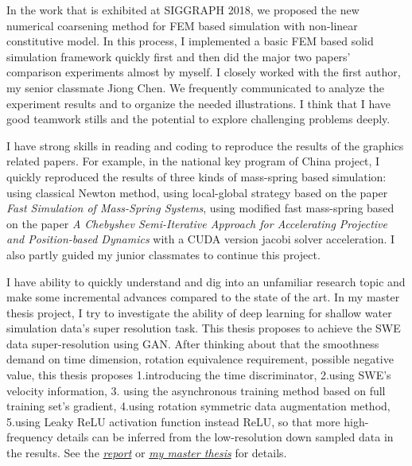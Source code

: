 \documentclass[a4paper,12pt]{article}
\begin{document}
In the work that is exhibited at SIGGRAPH 2018, we proposed the new numerical coarsening method for FEM based simulation with non-linear constitutive model. In this process, I implemented a basic FEM based solid simulation framework quickly first and then did the major two papers' comparison experiments almost by myself. I closely worked with the first author, my senior classmate Jiong Chen. We frequently communicated to analyze the experiment results and to organize the needed illustrations. I think that I have good teamwork stills and the potential to explore challenging problems deeply.\vspace{1.2ex}

I have strong skills in reading and coding to reproduce the results of the graphics related papers. For example, in the national key program of China project, I quickly reproduced the results of three kinds of mass-spring based simulation: using classical Newton method, using local-global strategy based on the paper \textit{Fast Simulation of Mass-Spring Systems}, using modified fast mass-spring based on the paper \textit{A Chebyshev Semi-Iterative Approach for Accelerating Projective and Position-based Dynamics} with a CUDA version jacobi solver acceleration. I also partly guided my junior classmates to continue this project.\vspace{1.2ex} %

I have ability to quickly understand and dig into an unfamiliar research topic and make some incremental advances compared to the state of the art. In my master thesis project, I try to investigate the ability of deep learning for shallow water simulation data's super resolution task. This thesis proposes to achieve the SWE data super-resolution using GAN. After thinking about that the smoothness demand on time dimension, rotation equivalence requirement, possible negative value, this thesis proposes 1.introducing the time discriminator, 2.using SWE's velocity information, 3. using the asynchronous training method based on full training set's gradient, 4.using rotation symmetric data augmentation method, 5.using Leaky ReLU activation function instead ReLU, so that more high-frequency details can be inferred from the low-resolution down sampled data in the results. See the \textit{\href{https://wtyatzoo.github.io/reports/SWE.pdf}{report}} or \textit{\href{https://wtyatzoo.github.io/thesis/master\_thesis.pdf}{my master thesis}} for details.\vspace{1.2ex}  %
\end{document}

